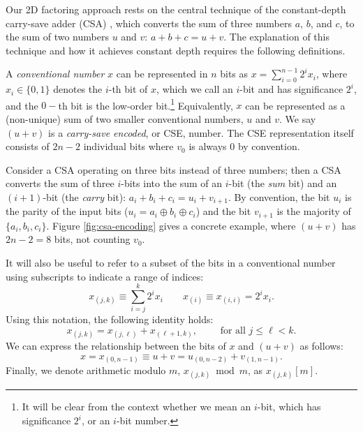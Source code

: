 \documentclass[twoside]{article}
\begin{document}
Our 2D factoring approach rests on the central technique of the constant-depth
carry-save adder (CSA) \cite{Gossett1998}, which converts the sum of three
numbers $a$, $b$, and $c$, to the sum of two numbers $u$ and $v$:
$a+b+c = u+v$. The explanation of this technique and how it achieves constant depth requires the following definitions.

A \emph{conventional number} $x$ can be represented in $n$ bits as
$x = \sum_{i=0}^{n-1} 2^i x_i$,
where $x_i \in \{0,1\}$ denotes the $i$-th bit of $x$, which we call
an $i$-bit and has significance $2^i$, and the $0-$th bit is the low-order bit.\footnote{It will be clear from the context whether we mean an
$i$-bit, which has significance $2^i$, or an $i$-bit number.}
Equivalently, $x$ can be represented as a (non-unique)
sum of two smaller conventional numbers, $u$ and $v$.
We say $(u+v)$ is a \emph{carry-save encoded}, or CSE, number.
The CSE representation itself consists of $2n-2$ individual
bits where $v_0$ is always $0$ by convention.

Consider a CSA operating on three bits instead of three numbers; 
then a CSA converts the sum of three
$i$-bits into the sum of an $i$-bit (the \emph{sum} bit) and an $(i+1)$-bit
(the \emph{carry} bit):
$a_i+b_i+c_i = u_i+v_{i+1}$.
By convention, the bit $u_i$ is the parity of the input bits
($u_i = a_i \oplus b_i \oplus c_i$) and
the bit $v_{i+1}$ is the majority of $\{a_i, b_i, c_i\}$.
Figure \ref{fig:csa-encoding} gives a concrete example, where
$(u+v)$ has $2n-2 = 8$ bits, not counting $v_0$.

%
It will also be useful to refer to a subset of the bits in a conventional
number using subscripts to indicate a range of indices:
\begin{equation}
x_{(j,k)} \equiv \sum_{i=j}^k 2^ix_i \qquad
x_{(i)} \equiv x_{(i,i)} = 2^ix_i.
\end{equation}
%
Using this notation, the following identity holds:
\begin{equation}
x_{(j,k)} = x_{(j,\ell)} + x_{(\ell+1,k)}, \qquad \text{ for all } j \le \ell < k.
\end{equation}
%
We can express the relationship between the bits of $x$ and $(u+v)$ as follows:
%
\begin{equation}
x = x_{(0,n-1)} \equiv u+v = u_{(0,n-2)} + v_{(1,n-1)}.
\end{equation}
%
Finally, we denote arithmetic modulo $m$, $x_{(j,k)} \bmod m$, as
$x_{(j,k)}[m]$.
\end{document}
